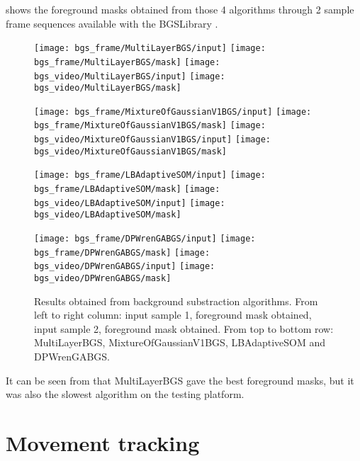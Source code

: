  shows the foreground masks obtained from those 4 algorithms through 2 sample frame sequences available with the BGSLibrary \cite{bgslibrary}.

\begin{figure}[H]
  \centering
  \texttt{[image: bgs\_frame/MultiLayerBGS/input]}
  \texttt{[image: bgs\_frame/MultiLayerBGS/mask]}
  \texttt{[image: bgs\_video/MultiLayerBGS/input]}
  \texttt{[image: bgs\_video/MultiLayerBGS/mask]}

  \texttt{[image: bgs\_frame/MixtureOfGaussianV1BGS/input]}
  \texttt{[image: bgs\_frame/MixtureOfGaussianV1BGS/mask]}
  \texttt{[image: bgs\_video/MixtureOfGaussianV1BGS/input]}
  \texttt{[image: bgs\_video/MixtureOfGaussianV1BGS/mask]}

  \texttt{[image: bgs\_frame/LBAdaptiveSOM/input]}
  \texttt{[image: bgs\_frame/LBAdaptiveSOM/mask]}
  \texttt{[image: bgs\_video/LBAdaptiveSOM/input]}
  \texttt{[image: bgs\_video/LBAdaptiveSOM/mask]}

  \texttt{[image: bgs\_frame/DPWrenGABGS/input]}
  \texttt{[image: bgs\_frame/DPWrenGABGS/mask]}
  \texttt{[image: bgs\_video/DPWrenGABGS/input]}
  \texttt{[image: bgs\_video/DPWrenGABGS/mask]}
  \caption{Results obtained from background substraction algorithms. From left to right column: input sample 1, foreground mask obtained, input sample 2, foreground mask obtained. From top to bottom row: MultiLayerBGS, MixtureOfGaussianV1BGS, LBAdaptiveSOM and DPWrenGABGS.}
  \label{Figure:bgs_frame}
\end{figure}

It can be seen from  that MultiLayerBGS gave the best foreground masks, but it was also the slowest algorithm on the testing platform.

\section{Movement tracking}

